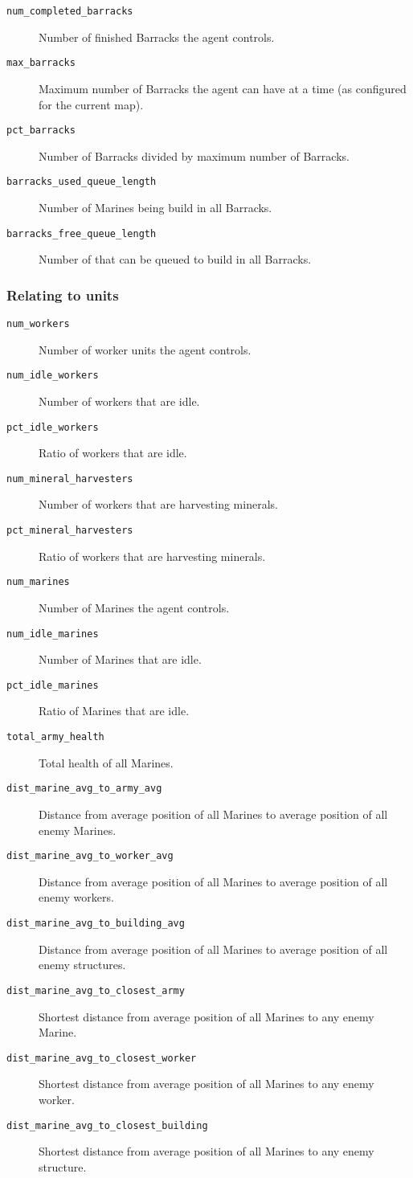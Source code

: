 \begin{description}
    \item[\texttt{num\_completed\_barracks}] Number of finished Barracks the agent controls.
    \item[\texttt{max\_barracks}] Maximum number of Barracks the agent can have at a time (as configured for the current map).
    \item[\texttt{pct\_barracks}] Number of Barracks divided by maximum number of Barracks.
    \item[\texttt{barracks\_used\_queue\_length}] Number of Marines being build in all Barracks.
    \item[\texttt{barracks\_free\_queue\_length}] Number of that can be queued to build in all Barracks.
\end{description}

\subsubsection*{Relating to units}
\begin{description}
    \item[\texttt{num\_workers}] Number of worker units the agent controls.
    \item[\texttt{num\_idle\_workers}] Number of workers that are idle.
    \item[\texttt{pct\_idle\_workers}] Ratio of workers that are idle.
    \item[\texttt{num\_mineral\_harvesters}] Number of workers that are harvesting minerals.
    \item[\texttt{pct\_mineral\_harvesters}] Ratio of workers that are harvesting minerals.
    \item[\texttt{num\_marines}] Number of Marines the agent controls.
    \item[\texttt{num\_idle\_marines}] Number of Marines that are idle.
    \item[\texttt{pct\_idle\_marines}] Ratio of Marines that are idle.
    \item[\texttt{total\_army\_health}] Total health of all Marines.
    \item[\texttt{dist\_marine\_avg\_to\_army\_avg}] Distance from average position of all Marines to average position of all enemy Marines.
    \item[\texttt{dist\_marine\_avg\_to\_worker\_avg}] Distance from average position of all Marines to average position of all enemy workers.
    \item[\texttt{dist\_marine\_avg\_to\_building\_avg}] Distance from average position of all Marines to average position of all enemy structures.
    \item[\texttt{dist\_marine\_avg\_to\_closest\_army}] Shortest distance from average position of all Marines to any enemy Marine.
    \item[\texttt{dist\_marine\_avg\_to\_closest\_worker}] Shortest distance from average position of all Marines to any enemy worker.
    \item[\texttt{dist\_marine\_avg\_to\_closest\_building}] Shortest distance from average position of all Marines to any enemy structure.
\end{description}

